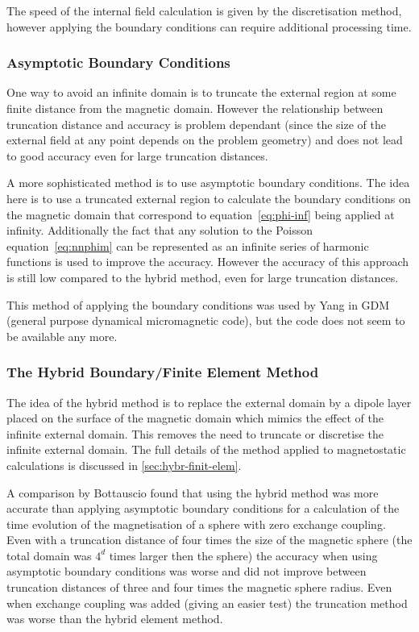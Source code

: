 The speed of the internal field calculation is given by the discretisation method, however applying the boundary conditions can require additional processing time.


\subsubsection{Asymptotic Boundary Conditions}
\label{sec:asymptot-bcs}

One way to avoid an infinite domain is to truncate the external region at some finite distance from the magnetic domain.
However the relationship between truncation distance and accuracy is problem dependant (since the size of the external field at any point depends on the problem geometry) and does not lead to good accuracy even for large truncation distances.

A more sophisticated method is to use asymptotic boundary conditions.\cite{Yang1997} The idea here is to use a truncated external region to calculate the boundary conditions on the magnetic domain that correspond to equation~\eqref{eq:phi-inf} being applied at infinity.
Additionally the fact that any solution to the Poisson equation~\eqref{eq:nnphim} can be represented as an infinite series of harmonic functions is used to improve the accuracy.
However the accuracy of this approach is still low compared to the hybrid method, even for large truncation distances.\cite{Bottauscio2008}

This method of applying the boundary conditions was used by Yang in GDM\cite{Yang1997} (general purpose dynamical micromagnetic code), but the code does not seem to be available any more.

\subsubsection{The Hybrid Boundary/Finite Element Method}
\label{sec:bound-elem-meth}

The idea of the hybrid method is to replace the external domain by a dipole layer placed on the surface of the magnetic domain which mimics the effect of the infinite external domain.
This removes the need to truncate or discretise the infinite external domain.
The full details of the method applied to magnetostatic calculations is discussed in \autoref{sec:hybr-finit-elem}.

A comparison by Bottauscio\cite{Bottauscio2008} found that using the hybrid method was more accurate than applying asymptotic boundary conditions for a calculation of the time evolution of the magnetisation of a sphere with zero exchange coupling.
Even with a truncation distance of four times the size of the magnetic sphere (the total domain was $4^d$ times larger then the sphere) the accuracy when using asymptotic boundary conditions was worse and did not improve between truncation distances of three and four times the magnetic sphere radius.
Even when exchange coupling was added (giving an easier test) the truncation method was worse than the hybrid element method.


